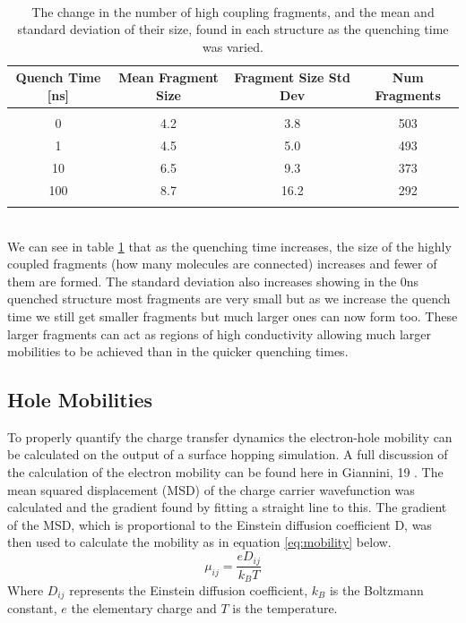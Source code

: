 \\
\begin{table}[h]
	\begin{tabular}{cccc}
		\textbf{Quench Time} [ns] & \textbf{Mean Fragment Size} & \textbf{Fragment Size Std Dev} & \textbf{Num Fragments} \\
		\hline &&&\\
		0 & 4.2 & 3.8 & 503 \\
		1 & 4.5 & 5.0 & 493 \\
		10 & 6.5 & 9.3 & 373 \\
		100 & 8.7 & 16.2 & 292 \\
		\hline &&&\\
	\end{tabular}
	\caption{\label{tab:cluster_sizes}The change in the number of high coupling fragments, and the mean and standard deviation of their size, found in each structure as the quenching time was varied.}
\end{table}
\\
We can see in table \ref{tab:cluster_sizes} that as the quenching time increases, the size of the highly coupled fragments (how many molecules are connected) increases and fewer of them are formed. The standard deviation also increases showing in the 0ns quenched structure most fragments are very small but as we increase the quench time we still get smaller fragments but much larger ones can now form too. These larger fragments can act as regions of high conductivity allowing much larger mobilities to be achieved than in the quicker quenching times.

\subsection{Hole Mobilities}
\label{sect:mobilities}
To properly quantify the charge transfer dynamics the electron-hole mobility can be calculated on the output of a surface hopping simulation. A full discussion of the calculation of the electron mobility can be found here in Giannini, 19 \cite{Giannini2019}. The mean squared displacement (MSD) of the charge carrier wavefunction was calculated and the gradient found by fitting a straight line to this. The gradient of the MSD, which is proportional to the Einstein diffusion coefficient D, was then used to calculate the mobility as in equation \eqref{eq:mobility} below.
\begin{equation}
	\mu_{ij} = \frac{e D_{ij}}{k_{B} T}
	\label{eq:mobility}
\end{equation}
Where $D_{ij}$ represents the Einstein diffusion coefficient, $k_{B}$ is the Boltzmann constant, $e$ the elementary charge and $T$ is the temperature.
